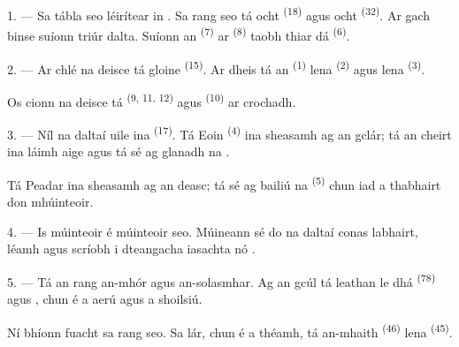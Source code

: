 \VUsaut{2.0mm}
\VUsaut{3.2mm}
\VUsaut{2.6mm}
\VUsaut{3.4mm}
\VUornamento{9pt}
\VUsaut{5.0mm}
\VUsaut{3.0mm}
\VUfilet{16mm}
\VUsaut{5.6mm}

\VUsaut{1.4mm}
\VUsaut{2.2mm}
\VUfilet{20mm}
\VUsaut{6.4mm}

\VUsaut{3.0mm}

1. --- Sa tábla seo léirítear  in . Sa rang seo tá ocht
 \textsuperscript{(18)} agus ocht 
\textsuperscript{(32)}. Ar gach binse suíonn triúr dalta. Suíonn an
 \textsuperscript{(7)} ar 
\textsuperscript{(8)} taobh thiar dá  \textsuperscript{(6)}.

2. --- Ar chlé na deisce tá  gloine \textsuperscript{(15)}. Ar dheis
tá an  \textsuperscript{(1)} lena 
\textsuperscript{(2)} agus lena  \textsuperscript{(3)}.

Os cionn na deisce tá  \textsuperscript{(9, 11, 12)} agus
 \textsuperscript{(10)} ar crochadh.

3. --- Níl na daltaí uile ina  \textsuperscript{(17)}. Tá Eoin
\textsuperscript{(4)} ina sheasamh ag an gclár; tá an cheirt ina láimh aige agus tá
sé ag glanadh na .

Tá Peadar ina sheasamh ag an deasc; tá sé ag bailiú na  \textsuperscript{(5)} chun iad a thabhairt don mhúinteoir.

4. --- Is múinteoir  é  múinteoir seo.
Múineann sé do na daltaí conas labhairt, léamh agus scríobh i dteangacha
iasachta  nó
.

5. --- Tá an rang an-mhór agus an-solasmhar. Ag an gcúl tá 
leathan le dhá  \textsuperscript{(78)} agus , chun é a aerú agus a shoilsiú.

Ní bhíonn fuacht sa rang seo. Sa lár, chun é a théamh, tá 
an-mhaith \textsuperscript{(46)} lena  \textsuperscript{(45)}.

